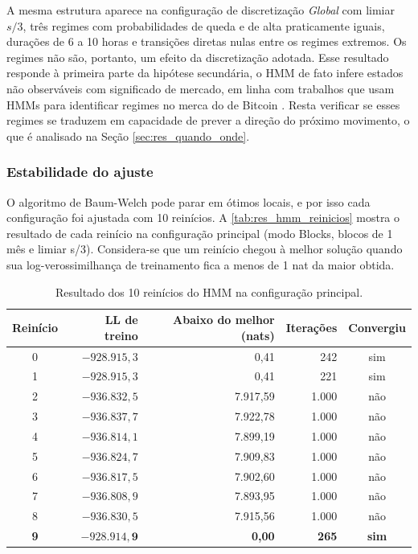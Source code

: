 \documentclass[
    12pt,                %
    openright,           %
    oneside,             %
    a4paper,             %
    english,             %
    brazil               %
]{abntex2}
\begin{document}
A mesma estrutura aparece na configuração de discretização \textit{Global} com limiar $s/3$, três regimes com probabilidades de queda e de alta praticamente iguais, 
durações de 6 a 10 horas e transições diretas nulas entre os regimes extremos. Os regimes não são, portanto, um efeito da discretização adotada. 
Esse resultado responde à primeira parte da hipótese secundária, o HMM de fato infere estados não observáveis com significado de mercado, em 
linha com trabalhos que usam HMMs para identificar regimes no merca do de Bitcoin \cite{malekinezhad2026}. Resta verificar se esses regimes se 
traduzem em capacidade de prever a direção do próximo movimento, o que é analisado na Seção \ref{sec:res_quando_onde}.

\subsubsection{Estabilidade do ajuste}
\label{sec:res_hmm_estabilidade}

O algoritmo de Baum-Welch pode parar em ótimos locais, e por isso cada configuração foi ajustada com 10 reinícios.
A \autoref{tab:res_hmm_reinicios} mostra o resultado de cada reinício na configuração principal (modo Blocks, blocos de 1 mês e limiar s/3). 
Considera-se que um reinício chegou à melhor solução quando sua log-verossimilhança de treinamento fica a menos de 1 nat da maior obtida.

\begin{table}[htbp]
    \centering
    \caption{Resultado dos 10 reinícios do HMM na configuração principal.}
    \label{tab:res_hmm_reinicios}
    \small
    \begin{tabular}{@{}crrrc@{}}
        \toprule
        \textbf{Reinício} & \textbf{LL de treino} & \textbf{Abaixo do melhor (nats)} & \textbf{Iterações} & \textbf{Convergiu} \\
        \midrule
        0 & $-928.915{,}3$ & 0,41 & 242 & sim \\
        1 & $-928.915{,}3$ & 0,41 & 221 & sim \\
        2 & $-936.832{,}5$ & 7.917,59 & 1.000 & não \\
        3 & $-936.837{,}7$ & 7.922,78 & 1.000 & não \\
        4 & $-936.814{,}1$ & 7.899,19 & 1.000 & não \\
        5 & $-936.824{,}7$ & 7.909,83 & 1.000 & não \\
        6 & $-936.817{,}5$ & 7.902,60 & 1.000 & não \\
        7 & $-936.808{,}9$ & 7.893,95 & 1.000 & não \\
        8 & $-936.830{,}5$ & 7.915,56 & 1.000 & não \\
        \textbf{9} & $\mathbf{-928.914{,}9}$ & \textbf{0,00} & \textbf{265} & \textbf{sim} \\
        \bottomrule
    \end{tabular}
\end{table}
\end{document}
